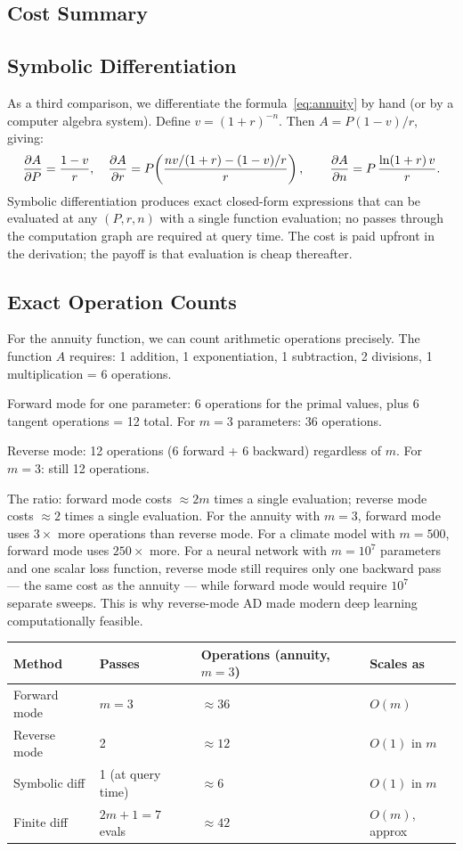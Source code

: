 \subsection{Cost Summary}

\subsection{Symbolic Differentiation}

As a third comparison, we differentiate the formula~\eqref{eq:annuity}
by hand (or by a computer algebra system). Define $v = (1+r)^{-n}$.
Then $A = P(1-v)/r$, giving:
\[
  \frac{\partial A}{\partial P} = \frac{1-v}{r}, \quad
  \frac{\partial A}{\partial r} = P\!\left(\frac{nv/(1+r) - (1-v)/r}{r}\right),
  \qquad
  \frac{\partial A}{\partial n} = P\,\frac{\ln(1+r)\,v}{r}.
\]
Symbolic differentiation produces exact closed-form expressions that can
be evaluated at any $(P, r, n)$ with a single function evaluation;
no passes through the computation graph are required at query time.
The cost is paid upfront in the derivation; the payoff is that evaluation
is cheap thereafter.

\subsection{Exact Operation Counts}

For the annuity function, we can count arithmetic operations precisely.
The function $A$ requires: 1 addition, 1 exponentiation, 1 subtraction,
2 divisions, 1 multiplication = 6 operations.

Forward mode for one parameter: 6 operations for the primal values,
plus 6 tangent operations = 12 total. For $m = 3$ parameters: 36 operations.

Reverse mode: 12 operations (6 forward + 6 backward) regardless of $m$.
For $m = 3$: still 12 operations.

The ratio: forward mode costs $\approx 2m$ times a single evaluation;
reverse mode costs $\approx 2$ times a single evaluation. For the annuity
with $m = 3$, forward mode uses $3\times$ more operations than reverse mode.
For a climate model with $m = 500$, forward mode uses $250\times$ more.
For a neural network with $m = 10^7$ parameters and one scalar loss function,
reverse mode still requires only one backward pass --- the same cost as the
annuity --- while forward mode would require $10^7$ separate sweeps.
This is why reverse-mode AD made modern deep learning computationally feasible.

\begin{center}
\begin{tabular}{llll}
\toprule
Method & Passes & Operations (annuity, $m=3$) & Scales as \\
\midrule
Forward mode & $m = 3$ & $\approx 36$ & $O(m)$ \\
Reverse mode & 2 & $\approx 12$ & $O(1)$ in $m$ \\
Symbolic diff & 1 (at query time) & $\approx 6$ & $O(1)$ in $m$ \\
Finite diff & $2m + 1 = 7$ evals & $\approx 42$ & $O(m)$, approx \\
\bottomrule
\end{tabular}
\end{center}

